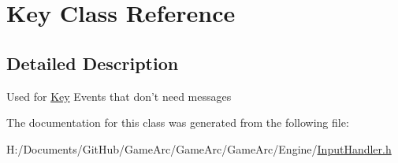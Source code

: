 \hypertarget{class_key}{\section{Key Class Reference}
\label{class_key}
}


\subsection{Detailed Description}
Used for \hyperlink{class_key}{Key} Events that don't need messages 

The documentation for this class was generated from the following file\+:\begin{DoxyCompactItemize}
\item 
H\+:/\+Documents/\+Git\+Hub/\+Game\+Arc/\+Game\+Arc/\+Game\+Arc/\+Engine/\hyperlink{_input_handler_8h}{Input\+Handler.\+h}\end{DoxyCompactItemize}

